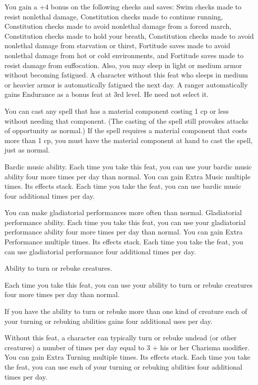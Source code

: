 {}
{You gain a +4 bonus on the following checks and saves: Swim checks made to resist nonlethal damage, Constitution checks made to continue running, Constitution checks made to avoid nonlethal damage from a forced march, Constitution checks made to hold your breath, Constitution checks made to avoid nonlethal damage from starvation or thirst, Fortitude saves made to avoid nonlethal damage from hot or cold environments, and Fortitude saves made to resist damage from suffocation. Also, you may sleep in light or medium armor without becoming fatigued.}
{A character without this feat who sleeps in medium or heavier armor is automatically fatigued the next day.}{}
{A ranger automatically gains Endurance as a bonus feat at 3rd level. He need not select it.}

{You can cast any spell that has a material component costing 1 cp or less without needing that component. (The casting of the spell still provokes attacks of opportunity as normal.) If the spell requires a material component that costs more than 1 cp, you must have the material component at hand to cast the spell, just as normal.}

{}
{Bardic music ability.}
{Each time you take this feat, you can use your bardic music ability four more times per day than normal.}
{}
{You can gain Extra Music multiple times. Its effects stack. Each time you take the feat, you can use bardic music four additional times per day.}

{You can make gladiatorial performances more often than normal.}
{Gladiatorial performance ability.}
{Each time you take this feat, you can use your gladiatorial performance ability four more times per day than normal.}
{}
{You can gain Extra Performance multiple times. Its effects stack. Each time you take the feat, you can use gladiatorial performance four additional times per day.}

{}
{Ability to turn or rebuke creatures.}
{Each time you take this feat, you can use your ability to turn or rebuke creatures four more times per day than normal.

If you have the ability to turn or rebuke more than one kind of creature each of your turning or rebuking abilities gains four additional uses per day.}
{Without this feat, a character can typically turn or rebuke undead (or other creatures) a number of times per day equal to 3 + his or her Charisma modifier.}
{You can gain Extra Turning multiple times. Its effects stack. Each time you take the feat, you can use each of your turning or rebuking abilities four additional times per day.}

